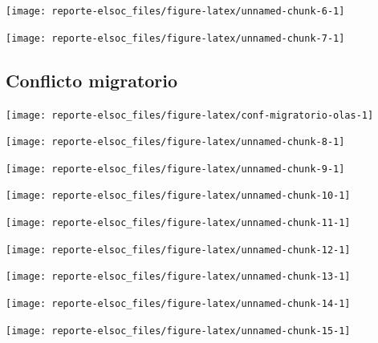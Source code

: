 \documentclass[
  12pt,
]{book}
\begin{document}
\begin{center}\texttt{[image: reporte-elsoc\_files/figure-latex/unnamed-chunk-6-1]} \end{center}

\begin{center}\texttt{[image: reporte-elsoc\_files/figure-latex/unnamed-chunk-7-1]} \end{center}

\hypertarget{conflicto-migratorio}{%
\subsection{Conflicto migratorio}\label{conflicto-migratorio}}

\begin{center}\texttt{[image: reporte-elsoc\_files/figure-latex/conf-migratorio-olas-1]} \end{center}

\begin{center}\texttt{[image: reporte-elsoc\_files/figure-latex/unnamed-chunk-8-1]} \end{center}

\begin{center}\texttt{[image: reporte-elsoc\_files/figure-latex/unnamed-chunk-9-1]} \end{center}

\begin{center}\texttt{[image: reporte-elsoc\_files/figure-latex/unnamed-chunk-10-1]} \end{center}

\begin{center}\texttt{[image: reporte-elsoc\_files/figure-latex/unnamed-chunk-11-1]} \end{center}

\begin{center}\texttt{[image: reporte-elsoc\_files/figure-latex/unnamed-chunk-12-1]} \end{center}

\begin{center}\texttt{[image: reporte-elsoc\_files/figure-latex/unnamed-chunk-13-1]} \end{center}

\begin{center}\texttt{[image: reporte-elsoc\_files/figure-latex/unnamed-chunk-14-1]} \end{center}

\begin{center}\texttt{[image: reporte-elsoc\_files/figure-latex/unnamed-chunk-15-1]} \end{center}
\end{document}
